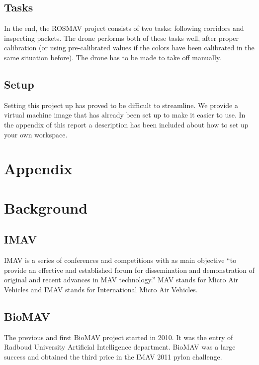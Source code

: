 \documentclass[a4paper,10pt]{article}
\begin{document}
\subsection{Tasks}
In the end, the ROSMAV project consists of two tasks: following corridors and
inspecting packets. The drone performs both of these tasks well, after proper
calibration (or using pre-calibrated values if the colors have been calibrated
in the same situation before). The drone has to be made to take off manually.
\subsection{Setup}
Setting this project up has proved to be difficult to streamline. We provide
a virtual machine image that has already been set up to make it easier to use.
In the appendix of this report a description has been included about how to set up your own workspace. 



\newpage
\section*{Appendix}
\section{Background}
\label{sec:background}
\subsection{IMAV}
IMAV is a series of conferences and competitions with as main objective
``to provide an effective and established forum for dissemination and
demonstration of original and recent advances in MAV technology.''\cite{imav}
MAV stands for Micro Air Vehicles and IMAV stands for International
Micro Air Vehicles.

\subsection{BioMAV}
The previous and first BioMAV project started in 2010. It was the entry
of Radboud University Artificial Intelligence department. BioMAV was a large
success and obtained the third price in the IMAV 2011 pylon challenge.
\end{document}

